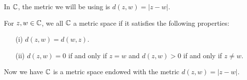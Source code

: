 \documentclass[a4paper]{report}
\begin{document}
In \( \mathbb{C}  \), the metric we will be using is \( d(z,w) =  | z - w  |  \).

\begin{definition}
   For \( z,w \in \mathbb{C}  \), we all \( \mathbb{C}  \) a metric space if it satisfies the following properties: 
   \begin{enumerate}
       \item[(i)] \( d(z,w) = d(w,z) \).
        \item[(ii)] \( d(z,w) = 0  \) if and only if \( z = w  \) and \( d(z,w) > 0  \) if and only if \( z \neq w  \).
   \end{enumerate}
\end{definition}

Now we have \( \mathbb{C}  \) is a metric space endowed with the metric \( d(z,w) = | z - w  |  \).
\end{document}
